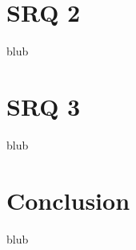 \section{SRQ 2}

\label{SectionLiteratureReviewSRQ2}

blub




\section{SRQ 3}

\label{SectionLiteratureReviewSRQ3}

blub





\section{Conclusion}

\label{SectionLiteratureReviewConclusion}

blub

